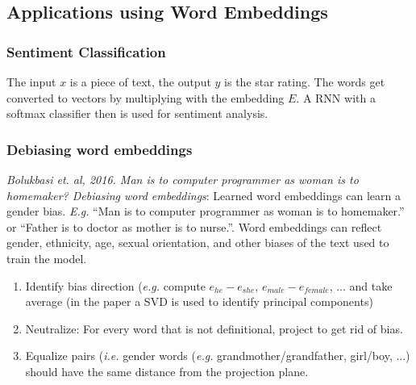 \documentclass{article}
\begin{document}
\subsection{Applications using Word Embeddings}
\subsubsection{Sentiment Classification}
The input $x$ is a piece of text, the output $y$ is the star rating.
The words get converted to vectors by multiplying with the embedding $E$.
A RNN with a softmax classifier then is used for sentiment analysis.

\subsubsection{Debiasing word embeddings}
\emph{Bolukbasi et. al, 2016. Man is to computer programmer as woman is to homemaker? Debiasing word embeddings}:
Learned word embeddings can learn a gender bias.
\emph{E.g.} ``Man is to computer programmer as woman is to homemaker.'' or
``Father is to doctor as mother is to nurse.''.
Word embeddings can reflect gender, ethnicity, age, sexual orientation, and other biases of the text used to train the model.
\begin{enumerate}
  \item Identify bias direction (\emph{e.g.} compute $e_{he}-e_{she}$, $e_{male}-e_{female}$, ... and take average
    (in the paper a SVD is used to identify principal components)
  \item Neutralize: For every word that is not definitional, project to get rid of bias.
  \item Equalize pairs (\emph{i.e.} gender words (\emph{e.g.} grandmother/grandfather, girl/boy, ...)
    should have the same distance from the projection plane.
\end{enumerate}
\end{document}
